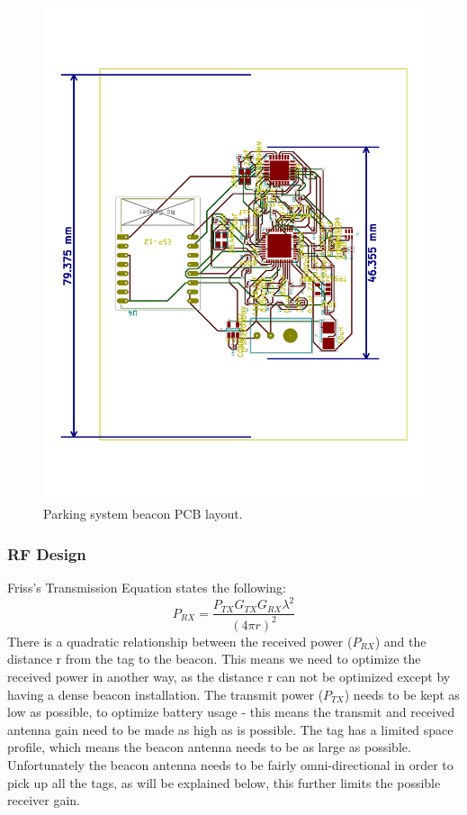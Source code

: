 \begin{figure}[H]
\begin{center}
\includegraphics[scale=0.4,trim={1cm 1cm 1cm 1cm},clip,angle=-90]{data/pcb-layout-ESP.pdf}
\caption{Parking system beacon PCB layout.}
\end{center}
\end{figure}



\newpage
\subsubsection{RF Design}



Friss's Transmission Equation states the following:
$$P_{RX} = \frac{P_{TX}G_{TX}G_{RX} \lambda^2}{(4 \pi r)^2}$$
There is a quadratic relationship between the received power ($P_{RX}$) and the distance r from the tag to the beacon. This means we need to optimize the received power in another way, as the distance r can not be optimized except by having a dense beacon installation. The transmit power ($P_{TX}$) needs to be kept as low as possible, to optimize battery usage - this means the transmit and received antenna gain need to be made as high as is possible. The tag has a limited space profile, which means the beacon antenna needs to be as large as possible. Unfortunately the beacon antenna needs to be fairly omni-directional in order to pick up all the tags, as will be explained below, this further limits the possible receiver gain.

